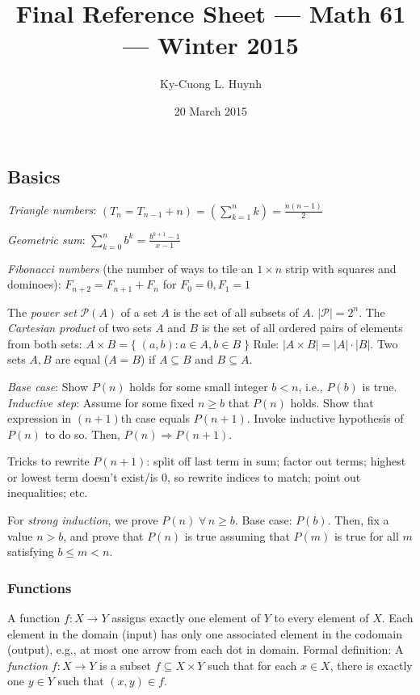 \documentclass[10pt,letterpaper,twocolumn]{article}
\title{Final Reference Sheet --- Math 61 
        --- Winter 2015}
\author{Ky-Cuong L. Huynh}
\date{20 March 2015}
\begin{document}
 

\maketitle
\frenchspacing

\subsection{Basics} 

\emph{Triangle numbers}: 
$ \left(T_n = T_{n-1} + n\right)
    =
    \left(\sum_{k=1}^{n} k\right)
    =
    \frac{n(n-1)}{2}
$

\emph{Geometric sum}: 
$ \sum_{k=0}^{n} b^{k} = \frac{b^{k+1} - 1}{x - 1} $

\emph{Fibonacci numbers} (the number of ways to tile 
an $ 1 \times n $ strip with squares and dominoes): 
$ F_{n+2} = F_{n+1} + F_{n} $ for $ F_0 = 0, F_1 = 1 $

The \emph{power set} $ \mathcal{P}(A) $ 
of a set $ A $ is the set of all subsets of $ A $. 
$ |\mathcal{P}| = 2^n $.
The \emph{Cartesian product} of two sets 
$ A $ and $ B $ is the set of all ordered pairs 
of elements from both sets: 
$ A \times B = \{ \; (a, b) : a \in A, b \in B \; \} $
Rule: $ |A \times B| = |A|\cdot|B| $.
Two sets $ A, B $ are equal ($ A = B $) if
$ A \subseteq B $ and $ B \subseteq A $.

\emph{Base case}: Show $ P(n) $ 
holds for some small integer
$ b < n $, i.e., $ P(b) $ is true. 
\emph{Inductive step}: Assume for some 
fixed $ n \ge b $ that $ P(n) $ holds.
Show that expression in $ (n + 1) $th 
case equals $ P(n + 1) $. Invoke inductive
hypothesis of $ P(n) $ to do so. Then, 
$ P(n) \Rightarrow P(n + 1) $. 

Tricks to rewrite $ P(n + 1) $: 
split off last term in sum; factor out terms; 
highest or lowest term doesn't exist/is 0, 
so rewrite indices to match; point out inequalities;
etc.

For \emph{strong induction}, we prove 
$ P(n) \; \forall \, n \ge b $. Base
case: $ P(b) $. Then, fix a value $ n > b $, 
and prove that $ P(n) $ is true assuming that 
$ P(m) $ is true for all $ m $ satisfying 
$ b \le m < n $. 


\subsubsection{Functions}

A function $ f: X \to Y $ assigns exactly one 
element of $ Y $ to every element of $ X $. 
Each element in the domain (input) has only 
one associated element in the codomain (output), 
e.g., at most one arrow from each dot in domain. 
Formal definition: A \emph{function} 
$ f : X \to Y $ is a subset 
$ f \subseteq X \times Y $ such that for each 
$ x \in X $, there is exactly one $ y \in Y $ 
such that $ (x, y) \in f $. 
\end{document}
